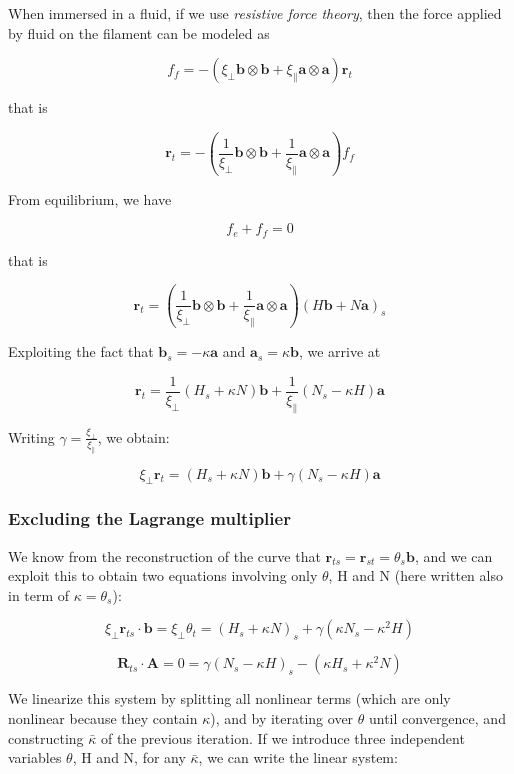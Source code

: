 When immersed in a fluid, if we use \emph{resistive force theory},
then the force applied by fluid on the filament can be modeled as

\[f_f = -( \xi_\perp \mathbf{b}\otimes \mathbf{b} +\xi_\parallel \mathbf{a}\otimes \mathbf{a}) \mathbf{r}_t\]

that is

\[\mathbf{r}_t = -\left( \frac{1}{\xi_\perp}  \mathbf{b}\otimes \mathbf{b} + \frac{1}{\xi_\parallel} \mathbf{a}\otimes \mathbf{a}\right) f_f\]

From equilibrium, we have

\[f_e+f_f = 0\]

that is

\[\mathbf{r}_t = \left( \frac{1}{\xi_\perp}  
\mathbf{b}\otimes \mathbf{b}  + \frac{1}{\xi_\parallel} \mathbf{a}\otimes \mathbf{a}\right) (H\mathbf{b} + N \mathbf{a})_s\]

Exploiting the fact that \(\mathbf{b}_s = - \kappa \mathbf{a}\) and \(\mathbf{a}_s = \kappa \mathbf{b}\), we
arrive at

\[\mathbf{r}_t =  \frac{1}{\xi_\perp} (H_s + \kappa N) \mathbf{b} + \frac{1}{\xi_\parallel}(N_s - \kappa H) \mathbf{a}\]

Writing $\gamma = \frac{\xi_\perp}{\xi_\parallel}$, we obtain:

\[\xi_\perp \mathbf{r}_t =   (H_s + \kappa N) \mathbf{b} + \gamma (N_s - \kappa H) \mathbf{a}\]

\subsubsection{Excluding the Lagrange multiplier}\label{differential-derivation}

We know from the reconstruction of the curve that
\(\mathbf{r}_{ts} = \mathbf{r}_{st} = \theta_s \mathbf{b}\),
and we can exploit this to obtain two equations involving only
\(\theta\),
H
and N (here written also in term of $\kappa = \theta_s$):

\[ \xi_\perp \mathbf{r}_{ts}\cdot \mathbf{b} =\xi_\perp \theta_t =   (H_s + \kappa N)_s + \gamma (\kappa N_s - \kappa^2 H)\]

\[\mathbf{R}_{ts}\cdot \mathbf{A} = 0 =  \gamma(N_s - \kappa H)_s - (\kappa H_s + \kappa^2 N) \]

We linearize this system by splitting all nonlinear terms (which are
only nonlinear because they contain \(\kappa\)), and by iterating over
\(\theta\) until convergence, and constructing \(\bar\kappa\) of the
previous iteration. If we introduce three independent variables
\(\theta\), H and N, for any \(\bar\kappa\), we can write
the linear system:

